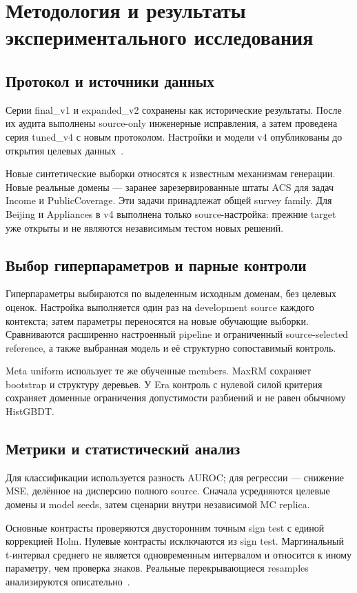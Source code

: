 \chapter{Методология и результаты экспериментального исследования}
\section{Протокол и источники данных}
Серии final\_v1 и expanded\_v2 сохранены как исторические результаты. После их аудита выполнены source-only инженерные исправления, а затем проведена серия tuned\_v4 с новым протоколом. Настройки и модели v4 опубликованы до открытия целевых данных~\cite{v4protocol}.

Новые синтетические выборки относятся к известным механизмам генерации. Новые реальные домены --- заранее зарезервированные штаты ACS для задач Income и PublicCoverage. Эти задачи принадлежат общей survey family. Для Beijing и Appliances в v4 выполнена только source-настройка: прежние target уже открыты и не являются независимым тестом новых решений.

\section{Выбор гиперпараметров и парные контроли}
Гиперпараметры выбираются по выделенным исходным доменам, без целевых оценок. Настройка выполняется один раз на development source каждого контекста; затем параметры переносятся на новые обучающие выборки. Сравниваются расширенно настроенный pipeline и ограниченный source-selected reference, а также выбранная модель и её структурно сопоставимый контроль.

Meta uniform использует те же обученные members. MaxRM сохраняет bootstrap и структуру деревьев. У Era контроль с нулевой силой критерия сохраняет доменные ограничения допустимости разбиений и не равен обычному HistGBDT.

\section{Метрики и статистический анализ}
Для классификации используется разность AUROC; для регрессии --- снижение MSE, делённое на дисперсию полного source. Сначала усредняются целевые домены и model seeds, затем сценарии внутри независимой MC replica.

Основные контрасты проверяются двусторонним точным sign test с единой коррекцией Holm. Нулевые контрасты исключаются из sign test. Маргинальный t-интервал среднего не является одновременным интервалом и относится к иному параметру, чем проверка знаков. Реальные перекрывающиеся resamples анализируются описательно~\cite{v4protocol,v4tests}.

